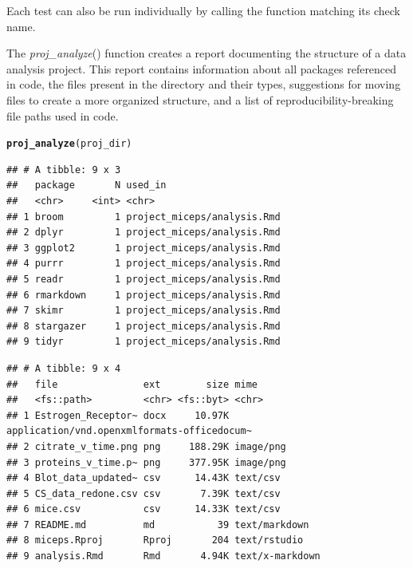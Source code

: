 \documentclass[APA,LATO1COL]{WileyNJD-v2}\usepackage[]{graphicx}\usepackage[]{color}
\makeatletter
\newcommand{\hlstd}[1]{\textcolor[rgb]{0.345,0.345,0.345}{#1}}%
\newcommand{\hlkwd}[1]{\textcolor[rgb]{0.737,0.353,0.396}{\textbf{#1}}}%
\newenvironment{kframe}{%
 \def\at@end@of@kframe{}%
 \ifinner\ifhmode%
  \def\at@end@of@kframe{\end{minipage}}%
  \begin{minipage}{\columnwidth}%
 \fi\fi%
 \def\FrameCommand##1{\hskip\@totalleftmargin \hskip-\fboxsep
 \colorbox{shadecolor}{##1}\hskip-\fboxsep
     \hskip-\linewidth \hskip-\@totalleftmargin \hskip\columnwidth}%
 \MakeFramed {\advance\hsize-\width
   \@totalleftmargin\z@ \linewidth\hsize
   \@setminipage}}%
 {\par\unskip\endMakeFramed%
 \at@end@of@kframe}
\newenvironment{knitrout}{}{} %
\newcommand{\func}[1]{\textit{#1}()}
\makeatother
\begin{document}
Each test can also be run individually by calling the function matching its check name.

The \func{proj\_analyze} function creates a report documenting the structure of a data analysis project. This report contains information about all packages referenced in code, the files present in the directory and their types, suggestions for moving files to create a more organized structure, and a list of reproducibility-breaking file paths used in code.

\begin{knitrout}
\color{fgcolor}\begin{kframe}
\begin{alltt}
\hlkwd{proj_analyze}\hlstd{(proj_dir)}
\end{alltt}


{\ttfamily\noindent\itshape\color{messagecolor}{\#\# -- Analysis of reproducibility for project\_miceps -------------------------------------------------------------------------------- fertile 0.0.0.9028 --}}

{\ttfamily\noindent\itshape\color{messagecolor}{\#\# --\ \  Packages referenced in source code ------------------------------------------------------------------------------------------ fertile 0.0.0.9028 --}}\begin{verbatim}
## # A tibble: 9 x 3
##   package       N used_in                    
##   <chr>     <int> <chr>                      
## 1 broom         1 project_miceps/analysis.Rmd
## 2 dplyr         1 project_miceps/analysis.Rmd
## 3 ggplot2       1 project_miceps/analysis.Rmd
## 4 purrr         1 project_miceps/analysis.Rmd
## 5 readr         1 project_miceps/analysis.Rmd
## 6 rmarkdown     1 project_miceps/analysis.Rmd
## 7 skimr         1 project_miceps/analysis.Rmd
## 8 stargazer     1 project_miceps/analysis.Rmd
## 9 tidyr         1 project_miceps/analysis.Rmd
\end{verbatim}


{\ttfamily\noindent\itshape\color{messagecolor}{\#\# --\ \  Files present in directory -------------------------------------------------------------------------------------------------- fertile 0.0.0.9028 --}}\begin{verbatim}
## # A tibble: 9 x 4
##   file               ext        size mime                                       
##   <fs::path>         <chr> <fs::byt> <chr>                                      
## 1 Estrogen_Receptor~ docx     10.97K application/vnd.openxmlformats-officedocum~
## 2 citrate_v_time.png png     188.29K image/png                                  
## 3 proteins_v_time.p~ png     377.95K image/png                                  
## 4 Blot_data_updated~ csv      14.43K text/csv                                   
## 5 CS_data_redone.csv csv       7.39K text/csv                                   
## 6 mice.csv           csv      14.33K text/csv                                   
## 7 README.md          md           39 text/markdown                              
## 8 miceps.Rproj       Rproj       204 text/rstudio                               
## 9 analysis.Rmd       Rmd       4.94K text/x-markdown
\end{verbatim}



\end{kframe}
\end{knitrout}
\end{document}
